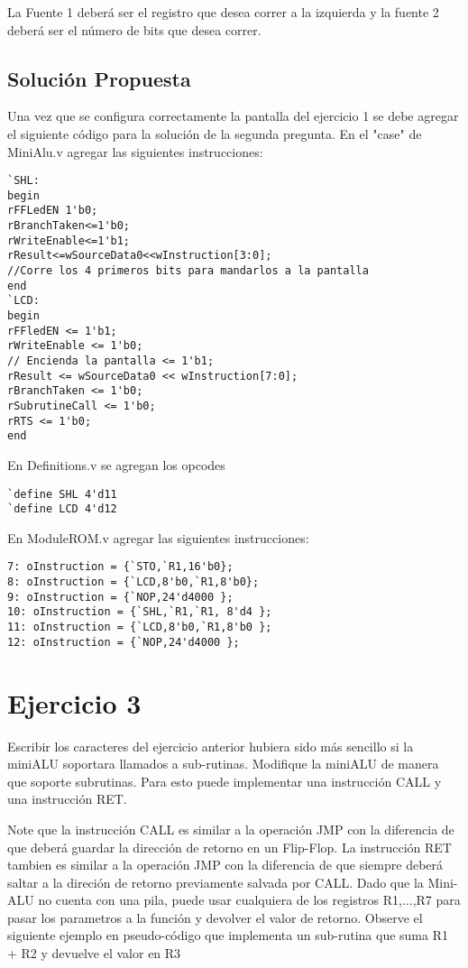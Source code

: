 \documentclass[10pt]{article}
\begin{document}
La Fuente 1 deberá ser el registro que desea correr a la izquierda y la fuente 2 deberá ser el número de bits que desea correr. 

\subsection*{Solución Propuesta}
Una vez que se configura correctamente la pantalla del ejercicio 1 se debe agregar el siguiente código para la solución de la segunda pregunta. En el "case" de MiniAlu.v agregar las siguientes instrucciones:

\begin{lstlisting}
`SHL:
begin
rFFLedEN 1'b0;
rBranchTaken<=1'b0;
rWriteEnable<=1'b1;
rResult<=wSourceData0<<wInstruction[3:0];
//Corre los 4 primeros bits para mandarlos a la pantalla
end
`LCD:
begin
rFFledEN <= 1'b1;
rWriteEnable <= 1'b0;
// Encienda la pantalla <= 1'b1;
rResult <= wSourceData0 << wInstruction[7:0];
rBranchTaken <= 1'b0;
rSubrutineCall <= 1'b0;
rRTS <= 1'b0;
end
\end{lstlisting}

En Definitions.v se agregan los opcodes

\begin{lstlisting}
`define SHL 4'd11
`define LCD 4'd12
\end{lstlisting}

En ModuleROM.v agregar las siguientes instrucciones:

\begin{lstlisting}
7: oInstruction = {`STO,`R1,16'b0};
8: oInstruction = {`LCD,8'b0,`R1,8'b0};
9: oInstruction = {`NOP,24'd4000 };
10: oInstruction = {`SHL,`R1,`R1, 8'd4 };
11: oInstruction = {`LCD,8'b0,`R1,8'b0 };
12: oInstruction = {`NOP,24'd4000 };
\end{lstlisting}

\section*{Ejercicio 3}

Escribir los caracteres del ejercicio anterior hubiera sido más sencillo si la miniALU soportara llamados a  sub-rutinas.
Modifique la miniALU de manera que soporte subrutinas. Para esto puede implementar una instrucción CALL y una instrucción RET. 

Note que la instrucción CALL es similar a la operación JMP con la diferencia de que deberá guardar la dirección de retorno en un Flip-Flop.
La instrucción  RET tambien es similar a la operación JMP con la diferencia de que siempre deberá saltar a la direción de retorno previamente salvada por CALL.
Dado que la Mini-ALU no cuenta con una pila, puede usar cualquiera de los registros R1,...,R7 para pasar los parametros a la función y devolver el valor de retorno.
Observe el siguiente ejemplo en pseudo-código que implementa un sub-rutina que suma R1 + R2 y devuelve el valor en R3
\end{document}
